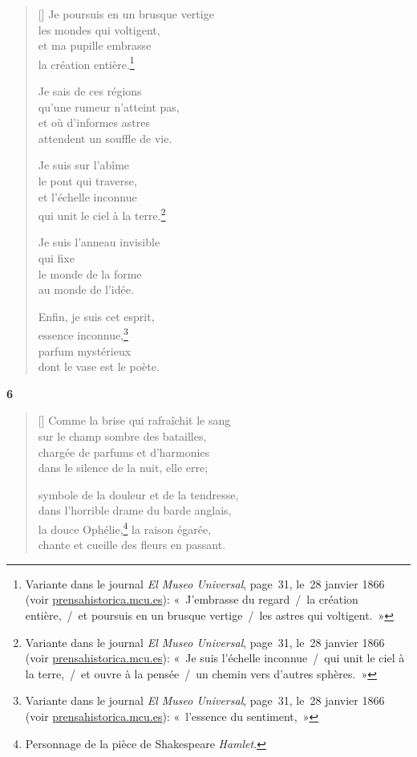 \documentclass[a4paper,12pt]{book}
\begin{document}
\begin{verse}[\versewidth]
  Je poursuis en un brusque vertige \\
  les mondes qui voltigent, \\
  et ma pupille embrasse \\
  la création entière.\footnote{Variante dans le journal
  \emph{El Museo Universal}, page~31, le~28 janvier 1866 (voir
  \url{prensahistorica.mcu.es}): «~J'embrasse du regard~/~la création
  entière,~/~et poursuis en un brusque vertige~/~les astres qui voltigent.~»}

  Je sais de ces régions \\
  qu'une rumeur n'atteint pas, \\
  et où d'informes astres \\
  attendent un souffle de vie.

  Je suis sur l'abîme \\
  le pont qui traverse, \\
  et l'échelle inconnue \\
  qui unit le ciel à la terre.\footnote{Variante dans le journal
  \emph{El Museo Universal}, page~31, le~28 janvier 1866 (voir
  \url{prensahistorica.mcu.es}): «~Je suis l'échelle inconnue~/~qui unit
  le ciel à la terre,~/~et ouvre à la pensée~/~un chemin vers d'autres
  sphères.~»}

  Je suis l'anneau invisible \\
  qui fixe \\
  le monde de la forme \\
  au monde de l'idée.

  Enfin, je suis cet esprit, \\
  essence inconnue,\footnote{Variante dans le journal
  \emph{El Museo Universal}, page~31, le~28 janvier 1866 (voir
  \url{prensahistorica.mcu.es}): «~l'essence du sentiment,~»} \\
  parfum mystérieux \\
  dont le vase est le poète.
\end{verse}

\bigskip

\begin{center}
  \textbf{6}
\end{center}

\settowidth{\versewidth}{chante et cueille des fleurs en passant.}

\begin{verse}[\versewidth]
  Comme la brise qui rafraîchit le sang \\
  sur le champ sombre des batailles, \\
  chargée de parfums et d'harmonies \\
  dans le silence de la nuit, elle erre;

  symbole de la douleur et de la tendresse, \\
  dans l'horrible drame du barde anglais, \\
  la douce Ophélie,\footnote{Personnage de la pièce de Shakespeare \emph{Hamlet}.} la raison égarée, \\
  chante et cueille des fleurs en passant.
\end{verse}
\end{document}
